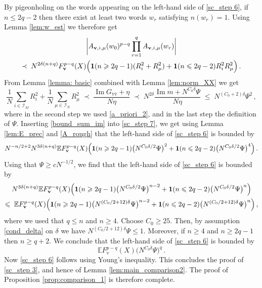 \documentclass[11pt]{article} %
\newcommand{\nc}{\normalcolor}
\numberwithin{equation}{section}
\numberwithin{figure}{section}
\theoremstyle{plain} %
\theoremstyle{definition} %
\newcommand{\f}[1]{\boldsymbol{\mathrm{#1}}} %
\renewcommand{\cal}{\mathcal}
\newcommand{\E}{\mathbb{E}}
\renewcommand{\leq}{\leqslant}
\renewcommand{\geq}{\geqslant}
\newcommand{\ind}[1]{\f 1 (#1)}
\newcommand{\pb}[1]{\bigl({#1}\bigr)}
\newcommand{\pB}[1]{\Bigl({#1}\Bigr)}
\newcommand{\absbb}[1]{\biggl\lvert #1 \biggr\rvert}
\DeclareMathOperator{\im}{Im}
\begin{document}
By pigeonholing  on the words appearing on the left-hand side of \eqref{sc_step 6}, \nc if $n \leq 2q - 2$ then there exist at least two words $w_r$ satisfying $n(w_r) = 1$. Using Lemma \ref{lem:w_est} we therefore get
\begin{multline} \label{sc_step 7}
\absbb{A_{\f v,i, \mu}(w_0)^{p - q} \prod_{r = 1}^{q} A_{\f v,i, \mu}(w_r)}
\\
\prec\; N^{2 \delta (n + q)} F_{\f v}^{p - q}(X) \pB{\ind{n \geq 2q - 1}  (R_i^2 + R_\mu^2) + \ind{n \leq 2q - 2} R_i^2 R_\mu^2}\,.
\end{multline}
From Lemma \ref{lemma: basic} combined with Lemma \ref{lem:norm_XX} we get
\begin{equation} \label{bound_sum_im}
\frac{1}{N}\sum_{i \in \cal I_M} R_i^2 + \frac{1}{N} \sum_{\mu \in \cal I_N }R_\mu^2 \;\prec\; \frac{\im G_{\bar {\f v} \bar {\f v}} + \eta}{N \eta} \;\prec\; N^{2 \delta} \frac{\im m + N^{C_0 \delta} \Psi}{N \eta} \;\leq\; N^{(C_0 + 2) \delta} \Psi^2\,,
\end{equation}
where in the second step we used \eqref{a_priori_2}, and in the last step the definition of $\Psi$.
Inserting \eqref{bound_sum_im} into \eqref{sc_step 7}, we get using Lemma \ref{lem:E_prec} and \eqref{A_rough} that the left-hand side of \eqref{sc_step 6} is bounded by
\begin{equation*}
N^{-n/2 + 2} N^{3 \delta (n + q)} \E F_{\f v}^{p - q}(X) \pB{\ind{n \geq 2q - 1} \pb{N^{C_0 \delta / 2}\Psi}^2 + \ind{n \leq 2q - 2} \pb{N^{C_0 \delta / 2}\Psi}^4}\,.
\end{equation*}
Using that $\Psi \geq c N^{-1/2}$, we find that the left-hand side of \eqref{sc_step 6} is bounded by
\begin{multline*}
N^{3 \delta (n + q)} \E F_{\f v}^{p - q}(X) \pB{\ind{n \geq 2q - 1} \pb{N^{C_0 \delta / 2}\Psi}^{n - 2} + \ind{n \leq 2q - 2} \pb{N^{C_0 \delta / 2}\Psi}^n}
\\
\leq\; \E F_{\f v}^{p - q}(X) \pB{\ind{n \geq 2q - 1} \pb{N^{(C_0 /2 + 12) \delta}\Psi}^{n - 2} + \ind{n \leq 2q - 2} \pb{N^{(C_0/2 + 12) \delta}\Psi}^n}\,,
\end{multline*}
where we used that $q \leq n$ and $n \geq 4$. Choose $C_0 \geq 25$. Then, by assumption \eqref{cond_delta} on $\delta$ we have $N^{(C_0/2 + 12) \delta}\Psi \leq 1$. Moreover, if $n \geq 4$ and $n \geq 2q - 1$ then $n \geq q + 2$. We conclude that the left-hand side of \eqref{sc_step 6} is bounded by
\begin{equation} \label{sc_step 8}
\E F_{\f v}^{p - q}(X) \pb{N^{C_0 \delta}\Psi}^{q}\,.
\end{equation}
Now \eqref{sc_step 6} follows using Young's inequality. This concludes the proof of \eqref{sc_step 3}, and hence of Lemma \ref{lem:main_comparison2}. The proof of Proposition \ref{prop:comparison_1} is therefore complete.
\end{document}
